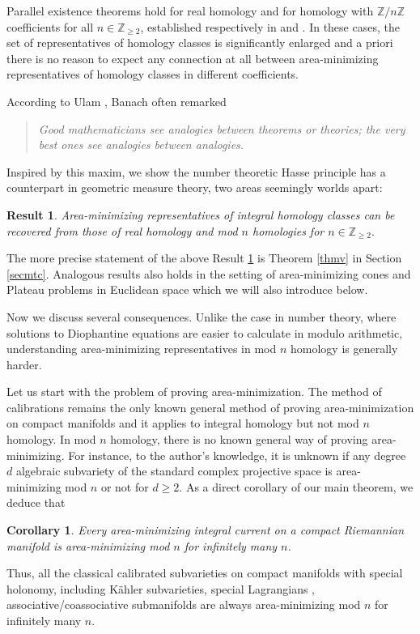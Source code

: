 \documentclass[11pt,a4paper]{amsart}
\numberwithin{equation}{section}
\newcommand{\Z}{\mathbb{Z}}
\theoremstyle{plain}
\newtheorem{rst}{Result}
\newtheorem{cor}{Corollary}[subsection]
\theoremstyle{definition}
\numberwithin{equation}{subsection}
\begin{document}
	Parallel existence theorems hold for real homology and for homology with $\mathbb Z/n\mathbb Z$ coefficients for all $n\in \Z_{\ge 2}$, established respectively in \cite{HFrf} and \cite{WFfc,BWrc,BWdt,WZmod2}. In these cases, the set of representatives of homology classes is significantly enlarged and a priori there is no reason to expect any connection at all between area-minimizing representatives of homology classes in different coefficients.
	
	According to Ulam \cite{SUna}, Banach often remarked
	\begin{quote}
		\emph{Good mathematicians see analogies between theorems or theories; the very best ones see analogies between analogies.}
	\end{quote}
	Inspired by this maxim, we show the number theoretic Hasse principle has a counterpart in geometric measure theory, two areas seemingly worlds apart:	\begin{rst}\label{rstm}
		Area-minimizing representatives of integral homology classes can be recovered from those of real homology and mod $n$ homologies for $n\in \Z_{\ge 2}.$
	\end{rst}
The more precise statement of the above Result \ref{rstm} is Theorem \ref{thmv} in Section \ref{secmtc}. Analogous results also holds in the setting of area-minimizing cones and Plateau problems in Euclidean space which we will also introduce below.

Now we discuss several consequences. Unlike the case in number theory, where solutions to Diophantine equations are easier to calculate in modulo arithmetic, understanding area-minimizing representatives in mod $n$ homology is generally harder. 
	
Let us start with the problem of proving area-minimization. The method of calibrations  \cite{HL,HFrf} remains the  only known general method of proving area-minimization on compact manifolds and it applies to integral homology but not mod $n$ homology. In mod $n$ homology, there is no known general way of proving area-minimizing. For instance, to the author's knowledge, it is unknown if any degree $d$ algebraic subvariety of the standard complex projective space is area-minimizing mod $n$ or not for $d\ge 2.$ As a direct corollary of our main theorem, we deduce that
\begin{cor}\label{corn}
	Every area-minimizing integral current on a compact Riemannian manifold is area-minimizing mod $n$ for infinitely many $n$.
\end{cor}
Thus, all the classical calibrated  subvarieties on compact manifolds with special holonomy, including K\"{a}hler subvarieties, special Lagrangians \cite{RBcs,RBes}, associative/coassociative \cite{RBcs,AHNP} submanifolds are always area-minimizing mod $n$ for infinitely many $n.$
\end{document}
